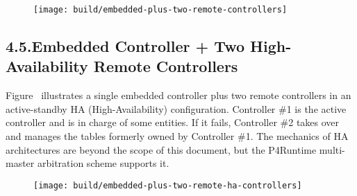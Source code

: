 \documentclass[11pt]{article}
\begin{document}
{%
\begin{figure}[tbp]%
\begin{mdcenter}%

\noindent{}\texttt{[image: build/embedded-plus-two-remote-controllers]}{}%

\mdhr{}%

\noindent{}%
\end{mdcenter}\label{fig-embedded-plus-two-remote-controllers}%
\end{figure}%

\subsection{4.5.\hspace*{0.5em}Embedded Controller + Two High-Availability Remote Controllers}\label{sec-embedded-controller-two-high-availability-remote-controllers}%

\noindent{}Figure~ illustrates a single
embedded controller plus two remote controllers in an active-standby HA
(High-Availability) configuration. Controller \#1 is the active controller and is
in charge of some entities. If it fails, Controller \#2 takes over and manages
the tables formerly owned by Controller \#1. The mechanics of HA architectures
are beyond the scope of this document, but the P4Runtime multi-master
arbitration scheme supports it.%

\begin{figure}[tbp]%
\begin{mdcenter}%

\noindent{}\texttt{[image: build/embedded-plus-two-remote-ha-controllers]}{}%

\mdhr{}%

\noindent{}%
\end{mdcenter}\label{fig-embedded-plus-two-remote-ha-controllers}%
\end{figure}%

}
\end{document}
